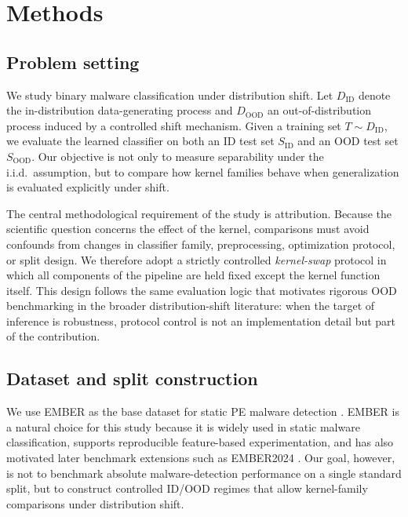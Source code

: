 \documentclass[pdflatex,sn-mathphys-num]{sn-jnl}%
\theoremstyle{thmstyleone}%
\theoremstyle{thmstyletwo}%
\theoremstyle{thmstylethree}%
\begin{document}
\section{Methods}
\label{sec:methods}

\subsection{Problem setting}

We study binary malware classification under distribution shift. Let $D_{\mathrm{ID}}$ denote the in-distribution data-generating process and $D_{\mathrm{OOD}}$ an out-of-distribution process induced by a controlled shift mechanism. Given a training set $T \sim D_{\mathrm{ID}}$, we evaluate the learned classifier on both an ID test set $S_{\mathrm{ID}}$ and an OOD test set $S_{\mathrm{OOD}}$. Our objective is not only to measure separability under the i.i.d.\ assumption, but to compare how kernel families behave when generalization is evaluated explicitly under shift.

The central methodological requirement of the study is attribution. Because the scientific question concerns the effect of the kernel, comparisons must avoid confounds from changes in classifier family, preprocessing, optimization protocol, or split design. We therefore adopt a strictly controlled \emph{kernel-swap} protocol in which all components of the pipeline are held fixed except the kernel function itself. This design follows the same evaluation logic that motivates rigorous OOD benchmarking in the broader distribution-shift literature: when the target of inference is robustness, protocol control is not an implementation detail but part of the contribution.

\subsection{Dataset and split construction}

We use EMBER as the base dataset for static PE malware detection \cite{anderson2018ember}. EMBER is a natural choice for this study because it is widely used in static malware classification, supports reproducible feature-based experimentation, and has also motivated later benchmark extensions such as EMBER2024 \cite{joyce2025ember2024}. Our goal, however, is not to benchmark absolute malware-detection performance on a single standard split, but to construct controlled ID/OOD regimes that allow kernel-family comparisons under distribution shift.
\end{document}
